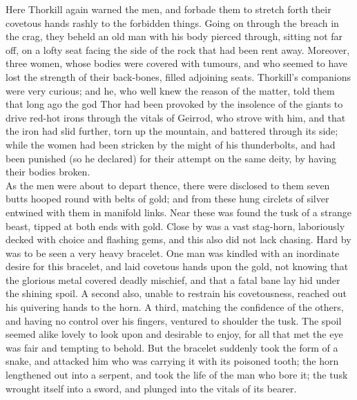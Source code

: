 \documentclass[10pt,a4paper]{report}
\begin{document}
Here Thorkill again warned the men, and forbade them to stretch forth their covetous hands rashly to the forbidden things. Going on through the breach in the crag, they beheld an old man with his body pierced through, sitting not far off, on a lofty seat facing the side of the rock that had been rent away. Moreover, three women, whose bodies were covered with tumours, and who seemed to have lost the strength of their back-bones, filled adjoining seats. Thorkill's companions were very curious; and he, who well knew the reason of the matter, told them that long ago the god Thor had been provoked by the insolence of the giants to drive red-hot irons through the vitals of Geirrod, who strove with him, and that the iron had slid further, torn up the mountain, and battered through its side; while the women had been stricken by the might of his thunderbolts, and had been punished (so he declared) for their attempt on the same deity, by having their bodies broken.\\

As the men were about to depart thence, there were disclosed to them seven butts hooped round with belts of gold; and from these hung circlets of silver entwined with them in manifold links. Near these was found the tusk of a strange beast, tipped at both ends with gold. Close by was a vast stag-horn, laboriously decked with choice and flashing gems, and this also did not lack chasing. Hard by was to be seen a very heavy bracelet. One man was kindled with an inordinate desire for this bracelet, and laid covetous hands upon the gold, not knowing that the glorious metal covered deadly mischief, and that a fatal bane lay hid under the shining spoil. A second also, unable to restrain his covetousness, reached out his quivering hands to the horn. A third, matching the confidence of the others, and having no control over his fingers, ventured to shoulder the tusk. The spoil seemed alike lovely to look upon and desirable to enjoy, for all that met the eye was fair and tempting to behold. But the bracelet suddenly took the form of a snake, and attacked him who was carrying it with its poisoned tooth; the horn lengthened out into a serpent, and took the life of the man who bore it; the tusk wrought itself into a sword, and plunged into the vitals of its bearer.\\
\end{document}
